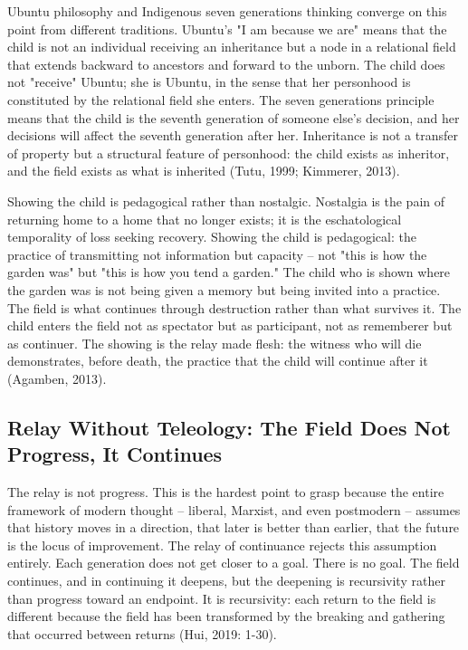 Ubuntu philosophy and Indigenous seven generations thinking converge on this point from different traditions. Ubuntu's "I am because we are" means that the child is not an individual receiving an inheritance but a node in a relational field that extends backward to ancestors and forward to the unborn. The child does not "receive" Ubuntu; she is Ubuntu, in the sense that her personhood is constituted by the relational field she enters. The seven generations principle means that the child is the seventh generation of someone else's decision, and her decisions will affect the seventh generation after her. Inheritance is not a transfer of property but a structural feature of personhood: the child exists as inheritor, and the field exists as what is inherited (Tutu, 1999; Kimmerer, 2013).

Showing the child is pedagogical rather than nostalgic. Nostalgia is the pain of returning home to a home that no longer exists; it is the eschatological temporality of loss seeking recovery. Showing the child is pedagogical: the practice of transmitting not information but capacity -- not "this is how the garden was" but "this is how you tend a garden." The child who is shown where the garden was is not being given a memory but being invited into a practice. The field is what continues through destruction rather than what survives it. The child enters the field not as spectator but as participant, not as rememberer but as continuer. The showing is the relay made flesh: the witness who will die demonstrates, before death, the practice that the child will continue after it (Agamben, 2013).

\subsection{Relay Without Teleology: The Field Does Not Progress, It Continues}

The relay is not progress. This is the hardest point to grasp because the entire framework of modern thought -- liberal, Marxist, and even postmodern -- assumes that history moves in a direction, that later is better than earlier, that the future is the locus of improvement. The relay of continuance rejects this assumption entirely. Each generation does not get closer to a goal. There is no goal. The field continues, and in continuing it deepens, but the deepening is recursivity rather than progress toward an endpoint. It is recursivity: each return to the field is different because the field has been transformed by the breaking and gathering that occurred between returns (Hui, 2019: 1-30).

